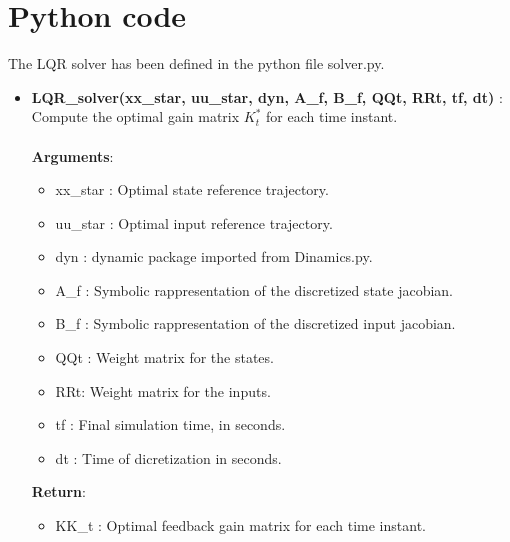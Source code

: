 \section*{Python code}

The LQR solver has been defined in the python file solver.py.

\begin{itemize}
    \item \textbf{LQR\_solver(xx\_star, uu\_star, dyn, A\_f, B\_f, QQt, RRt, tf, dt) }: Compute the optimal gain matrix $K_t^*$ for each time instant.\\\\
    \textbf{Arguments}:
    \begin{itemize}
        \item xx\_star : Optimal state reference trajectory.
        \item uu\_star : Optimal input reference trajectory.
        \item dyn : dynamic package imported from Dinamics.py.
        \item A\_f : Symbolic rappresentation of the discretized state jacobian.
        \item B\_f : Symbolic rappresentation of the discretized input jacobian.
        \item QQt : Weight matrix for the states.
        \item RRt: Weight matrix for the inputs.
        \item tf : Final simulation time, in seconds.
        \item dt : Time of dicretization in seconds.
    \end{itemize}
    \textbf{Return}:
    \begin{itemize}
        \item KK\_t : Optimal feedback gain matrix for each time instant.
    \end{itemize}
\end{itemize}